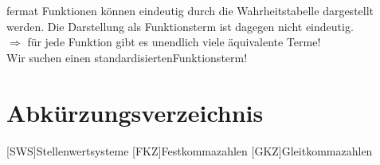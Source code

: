 \documentclass[10pt,a4paper]{scrartcl}
\begin{document}
\begin{Hint}{}{fermat}
	Funktionen können eindeutig durch die Wahrheitstabelle dargestellt werden. Die Darstellung als Funktionsterm ist dagegen nicht eindeutig.\\
	$\Rightarrow$ für jede Funktion gibt es unendlich viele äquivalente Terme!\\
	Wir suchen einen \glqq standardisierten\grqq Funktionsterm!
\end{Hint}


\newpage
\section*{Abkürzungsverzeichnis}
\begin{acronym}[Bash]
	[SWS]{Stellenwertsysteme}
	[FKZ]{Festkommazahlen}
	[GKZ]{Gleitkommazahlen}
\end{acronym}
\end{document}
